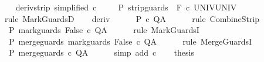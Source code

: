 \begin{isabellebody}
\ \ \isamarkupfalse%
\ deriv{\isacharunderscore}strip\ {\isacharbrackleft}simplified\ c{\isacharprime}{\isacharprime}{\isacharbrackright}\isanewline
\ \ \isamarkupfalse%
\ {\isachardoublequoteopen}{\isasymGamma}{\isacharcomma}{\isasymTheta}{\isasymturnstile}\isactrlbsub {\isacharslash}{\isacharbraceleft}{\isacharbraceright}\isactrlesub \ P\ {\isacharparenleft}strip{\isacharunderscore}guards\ {\isacharparenleft}{\isacharminus}\ F{\isacharparenright}\ c{\isacharprime}{\isacharparenright}\ UNIV{\isacharcomma}UNIV{\isachardoublequoteclose}\isanewline
\ \ \ \ \isamarkupfalse%
\ {\isacharparenleft}rule\ MarkGuardsD{\isacharparenright}\isanewline
\ \ \isamarkupfalse%
\ deriv\ \isanewline
\ \ \isamarkupfalse%
\ {\isachardoublequoteopen}{\isasymGamma}{\isacharcomma}{\isasymTheta}{\isasymturnstile}\isactrlbsub {\isacharslash}{\isacharbraceleft}{\isacharbraceright}\isactrlesub \ P\ c{\isacharprime}\ Q{\isacharcomma}A{\isachardoublequoteclose}\isanewline
\ \ \ \ \isamarkupfalse%
\ {\isacharparenleft}rule\ CombineStrip{\isacharparenright}\isanewline
\ \ \isamarkupfalse%
\ {\isachardoublequoteopen}{\isasymGamma}{\isacharcomma}{\isasymTheta}{\isasymturnstile}\isactrlbsub {\isacharslash}{\isacharbraceleft}{\isacharbraceright}\isactrlesub \ P\ mark{\isacharunderscore}guards\ False\ c{\isacharprime}\ Q{\isacharcomma}A{\isachardoublequoteclose}\isanewline
\ \ \ \ \isamarkupfalse%
\ {\isacharparenleft}rule\ MarkGuardsI{\isacharparenright}\isanewline
\ \ \isamarkupfalse%
\ {\isachardoublequoteopen}{\isasymGamma}{\isacharcomma}{\isasymTheta}{\isasymturnstile}\isactrlbsub {\isacharslash}{\isacharbraceleft}{\isacharbraceright}\isactrlesub \ P\ merge{\isacharunderscore}guards\ {\isacharparenleft}mark{\isacharunderscore}guards\ False\ c{\isacharprime}{\isacharparenright}\ Q{\isacharcomma}A{\isachardoublequoteclose}\isanewline
\ \ \ \ \isamarkupfalse%
\ {\isacharparenleft}rule\ MergeGuardsI{\isacharparenright}\isanewline
\ \ \isamarkupfalse%
\ {\isachardoublequoteopen}{\isasymGamma}{\isacharcomma}{\isasymTheta}{\isasymturnstile}\isactrlbsub {\isacharslash}{\isacharbraceleft}{\isacharbraceright}\isactrlesub \ P\ merge{\isacharunderscore}guards\ c\ Q{\isacharcomma}A{\isachardoublequoteclose}\isanewline
\ \ \ \ \isamarkupfalse%
\ {\isacharparenleft}simp\ add{\isacharcolon}\ c{\isacharparenright}\isanewline
\ \ \isamarkupfalse%
\ {\isacharquery}thesis\isanewline
\ \ \ \ \isamarkupfalse%

\end{isabellebody}
